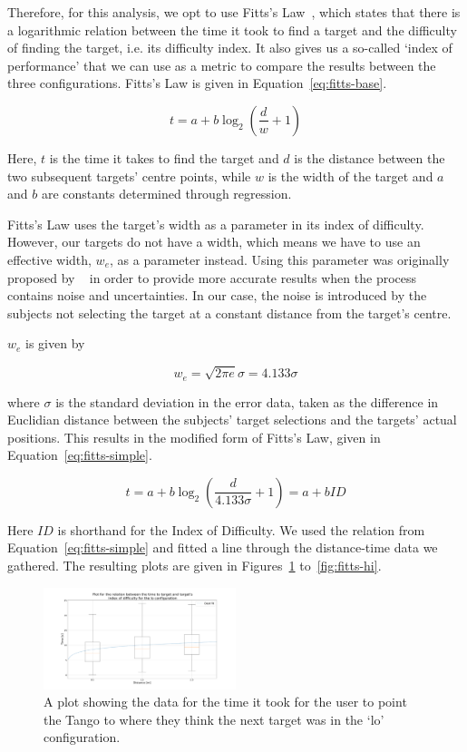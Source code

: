 \documentclass[format=sigconf, review=true, screen=true, anonymous=true]{acmart}
\begin{document}
Therefore, for this analysis, we opt to use Fitts's Law~\cite{fitts1954information}, which states that there is a logarithmic relation between the time it took to find a target and the difficulty of finding the target, i.e. its difficulty index. It also gives us a so-called `index of performance' that we can use as a metric to compare the results between the three configurations. Fitts's Law is given in Equation~\ref{eq:fitts-base}. 

\begin{equation}
  \label{eq:fitts-base}
  t = a + b\log_2\left(\frac{d}{w} + 1\right)
\end{equation}

Here, $t$ is the time it takes to find the target and $d$ is the distance between the two subsequent targets' centre points, while $w$ is the width of the target and $a$ and $b$ are constants determined through regression.

Fitts's Law uses the target's width as a parameter in its index of difficulty. However, our targets do not have a width, which means we have to use an effective width, $w_e$, as a parameter instead. Using this parameter was originally proposed by \citeauthor{mackenzie1992fitts}~\cite{mackenzie1992fitts} in order to provide more accurate results when the process contains noise and uncertainties. In our case, the noise is introduced by the subjects not selecting the target at a constant distance from the target's centre. 

$w_e$ is given by 

\[
  w_e = \sqrt{2\pi e}\sigma = 4.133\sigma
\]

where $\sigma$ is the standard deviation in the error data, taken as the difference in Euclidian distance between the subjects' target selections and the targets' actual positions. This results in the modified form of Fitts's Law, given in Equation~\ref{eq:fitts-simple}.

\begin{equation}
  \label{eq:fitts-simple}
  t = a + b\log_2\left(\frac{d}{4.133\sigma} + 1\right) = a + b ID
\end{equation}

Here $ID$ is shorthand for the Index of Difficulty. We used the relation from Equation~\ref{eq:fitts-simple} and fitted a line through the distance-time data we gathered. The resulting plots are given in Figures~\ref{fig:fitts-lo} to~\ref{fig:fitts-hi}. 

\begin{figure}
  \centering
  \includegraphics[width=0.5\textwidth]{figures/fitts_lo.png}
  \caption{A plot showing the data for the time it took for the user to point the Tango to where they think the next target was in the `lo' configuration. }
  \label{fig:fitts-lo}
\end{figure}
\end{document}
